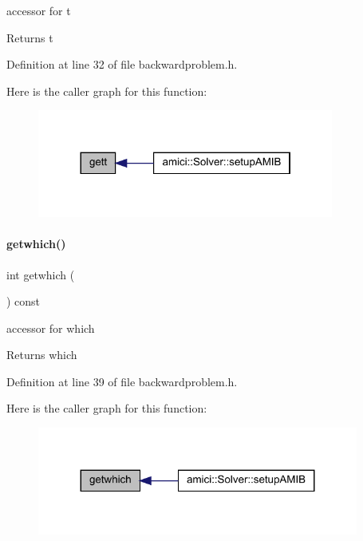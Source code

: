accessor for t \begin{DoxyReturn}{Returns}
t 
\end{DoxyReturn}


Definition at line 32 of file backwardproblem.\+h.

Here is the caller graph for this function\+:
\nopagebreak
\begin{figure}[H]
\begin{center}
\leavevmode
\includegraphics[width=276pt]{classamici_1_1_backward_problem_a1582a658df3f51a8c88b6f22b4205b3f_icgraph}
\end{center}
\end{figure}
\mbox{\label{classamici_1_1_backward_problem_ac337bf2284c1febeb302019b06c54c3e}} 
\paragraph{\texorpdfstring{getwhich()}{getwhich()}}
{\footnotesize\ttfamily int getwhich (\begin{DoxyParamCaption}{ }\end{DoxyParamCaption}) const}

accessor for which \begin{DoxyReturn}{Returns}
which 
\end{DoxyReturn}


Definition at line 39 of file backwardproblem.\+h.

Here is the caller graph for this function\+:
\nopagebreak
\begin{figure}[H]
\begin{center}
\leavevmode
\includegraphics[width=299pt]{classamici_1_1_backward_problem_ac337bf2284c1febeb302019b06c54c3e_icgraph}
\end{center}
\end{figure}
\mbox{\label{classamici_1_1_backward_problem_a209a0d59a5a5eebfba1e6db5cb209132}} 
